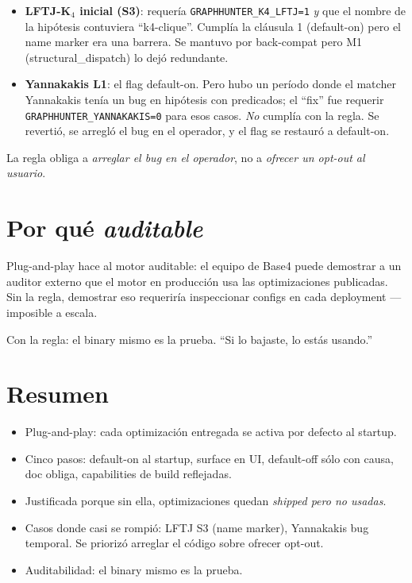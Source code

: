 \begin{itemize}
    \item \textbf{LFTJ-K\(_4\) inicial (S3)}: requería
    \texttt{GRAPHHUNTER\_K4\_LFTJ=1} \emph{y} que el nombre de la
    hipótesis contuviera ``k4-clique''. Cumplía la cláusula 1
    (default-on) pero el name marker era una barrera. Se mantuvo
    por back-compat pero M1 (structural\_dispatch) lo dejó
    redundante.
    \item \textbf{Yannakakis L1}: el flag default-on. Pero hubo un
    período donde el matcher Yannakakis tenía un bug en hipótesis
    con predicados; el ``fix'' fue requerir
    \texttt{GRAPHHUNTER\_YANNAKAKIS=0} para esos casos. \emph{No}
    cumplía con la regla. Se revertió, se arregló el bug en el
    operador, y el flag se restauró a default-on.
\end{itemize}

\noindent
La regla obliga a \emph{arreglar el bug en el operador}, no a
\emph{ofrecer un opt-out al usuario}.

\section{Por qué \emph{auditable}}

Plug-and-play hace al motor auditable: el equipo de Base4 puede
demostrar a un auditor externo que el motor en producción usa las
optimizaciones publicadas. Sin la regla, demostrar eso requeriría
inspeccionar configs en cada deployment ---imposible a escala.

Con la regla: el binary mismo es la prueba. ``Si lo bajaste, lo
estás usando.''

\section{Resumen}

\begin{itemize}
    \item Plug-and-play: cada optimización entregada se activa
    por defecto al startup.
    \item Cinco pasos: default-on al startup, surface en UI,
    default-off sólo con causa, doc obliga, capabilities de build
    reflejadas.
    \item Justificada porque sin ella, optimizaciones quedan
    \emph{shipped pero no usadas}.
    \item Casos donde casi se rompió: LFTJ S3 (name marker),
    Yannakakis bug temporal. Se priorizó arreglar el código
    sobre ofrecer opt-out.
    \item Auditabilidad: el binary mismo es la prueba.
\end{itemize}

